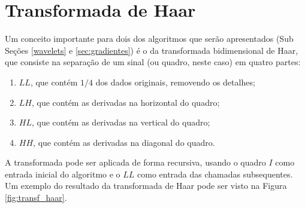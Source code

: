 \section{Transformada de Haar}

Um conceito importante para dois dos algoritmos que serão apresentados (Sub Seções  \ref{wavelets} e \ref{sec:gradientes}) é o da transformada bidimensional de Haar, que consiste na separação de um sinal (ou quadro, neste caso) em quatro partes: 

\begin{enumerate}
\item $LL$, que contém $1/4$ dos dados originais, removendo os detalhes;
\item $LH$, que contém as derivadas na horizontal do quadro;
\item $HL$, que contém as derivadas na vertical do quadro;
\item $HH$, que contém as derivadas na diagonal do quadro.
\end{enumerate}

A transformada pode ser aplicada de forma recursiva, usando o quadro $I$ como entrada inicial do algoritmo e o $LL$ como entrada das chamadas subsequentes. Um exemplo do resultado da transformada de Haar pode ser visto na Figura \ref{fig:transf_haar}.


